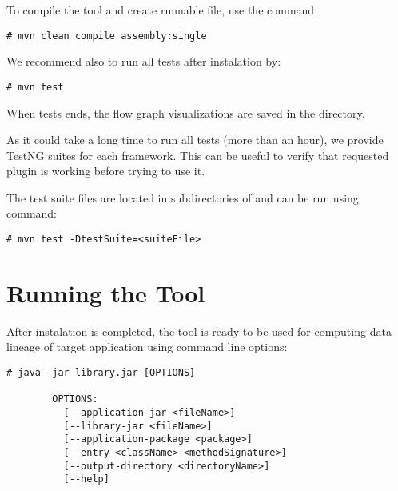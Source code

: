 To compile the \ToolName tool and create runnable  file, use the command:
\begin{lstlisting}[language=shell]
        # mvn clean compile assembly:single
\end{lstlisting}

We recommend also to run all tests after instalation by:
\begin{lstlisting}[language=shell]
        # mvn test
\end{lstlisting}
When tests ends, the flow graph visualizations are saved in the  directory.

As it could take a long time to run all tests (more than an hour), we provide TestNG
suites for each framework. This can be useful to verify that requested plugin is working
before trying to use it.

The test suite files are located in subdirectories of 
and can be run using command:
\begin{lstlisting}[language=shell]
        # mvn test -DtestSuite=<suiteFile>
\end{lstlisting}


\section{Running the \ToolName Tool}

After instalation is completed, the \ToolName tool is ready to be used for computing
data lineage of target application using command line options:


\begin{lstlisting}[language=shell]
        # java -jar library.jar [OPTIONS]

        OPTIONS:
          [--application-jar <fileName>]
          [--library-jar <fileName>]
          [--application-package <package>]
          [--entry <className> <methodSignature>]
          [--output-directory <directoryName>]
          [--help]
\end{lstlisting}

